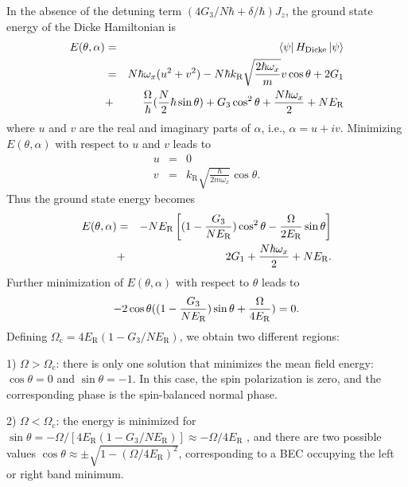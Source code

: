 \documentclass[prl,aps,twocolumn,floatfix]{revtex4}
\begin{document}
In the absence of the detuning term $(4G_3/N\hbar+\delta/\hbar)J_z$, the
ground state energy of the Dicke Hamiltonian is%
\begin{eqnarray}
E(\theta ,\alpha ) &=&\left\langle \psi \right\vert H_{\text{Dicke}%
}\left\vert \psi \right\rangle  \notag \\
&=&N\hbar \omega _{x}(u^{2}+v^{2})-N{\hbar }k_{\text{R}}\sqrt{\frac{2\hbar
\omega _{x}}{m}}v\cos \theta +2G_{1}  \notag \\
&+&\frac{\Omega }{\hbar }(\frac{N}{2}\hbar \sin \theta )+G_{3}\cos
^{2}\theta +\frac{N\hbar \omega _{x}}{2}+NE_{\text{R}}
\end{eqnarray}%
where $u$ and $v$ are the real and imaginary parts of $\alpha $, i.e., $%
\alpha =u+iv$. Minimizing $E(\theta ,\alpha )$ with respect to $u$ and $v$
leads to
\begin{eqnarray}
u &=&0  \label{Minimizing1} \\
v &=&k_{\text{R}}\sqrt{\frac{\hbar }{2m\omega _{x}}}\cos \theta .
\label{Minimizing2}
\end{eqnarray}%
Thus the ground state energy becomes
\begin{eqnarray}
E(\theta ,\alpha )&=&-NE_{\text{R}}\left[(1-\frac{G_{3}}{NE_{\text{R}}})\cos
^{2}\theta -\frac{\Omega }{2E_{\text{R}}}\sin \theta \right]  \notag \\
&+& 2G_{1}+\frac{N\hbar \omega _{x}}{2}+NE_{\text{R}}.
\end{eqnarray}%
Further minimization of $E(\theta ,\alpha )$ with respect to ${\theta }$
leads to
\begin{equation}
-2\cos \theta ((1- \frac{G_{3}}{NE_{\text{R}}})\sin \theta +\frac{\Omega }{%
4E_{\text{R}}})=0.  \notag
\end{equation}%
Defining $\Omega _{\text{c}}=4E_{\text{R}}(1-G_3/NE_\text{R})$, we obtain
two different regions:

1) $\Omega >\Omega _{\text{c}}$: there is only one solution that minimizes
the mean field energy: $\cos {\theta }=0$ and $\sin {\theta }=-1$. In this
case, the spin polarization is zero, and the corresponding phase is the
spin-balanced normal phase.

2) $\Omega <\Omega _{\text{c}}$: the energy is minimized for $\sin {\theta }%
=-\Omega /[4E_{\text{R}}(1-G_{3}/NE_\text{R})]\approx -\Omega /4E_{\text{R}}$
, and there are two possible values $\cos {\theta }\approx \pm \sqrt{1-(
\Omega/4E_{\text{R}})^{2}}$, corresponding to a BEC occupying the left or
right band minimum.
\end{document}

